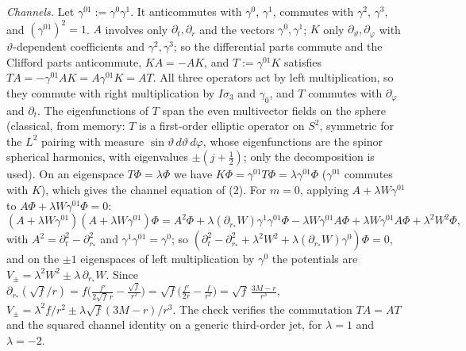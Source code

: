 \emph{Channels.} Let $\gamma^{01} := \gamma^{0}\gamma^{1}$. It anticommutes with $\gamma^{0}$, $\gamma^{1}$, commutes with $\gamma^{2}$, $\gamma^{3}$, and $(\gamma^{01})^{2} = 1$. $A$ involves only $\partial_{t}, \partial_{r}$ and the vectors $\gamma^{0}, \gamma^{1}$; $K$ only $\partial_{\vartheta}, \partial_{\varphi}$ with $\vartheta$-dependent coefficients and $\gamma^{2}, \gamma^{3}$; so the differential parts commute and the Clifford parts anticommute, $KA = -AK$, and $T := \gamma^{01}K$ satisfies $TA = -\gamma^{01}AK = A\gamma^{01}K = AT$. All three operators act by left multiplication, so they commute with right multiplication by $I\sigma_{3}$ and $\gamma_{0}$, and $T$ commutes with $\partial_{\varphi}$ and $\partial_{t}$. The eigenfunctions of $T$ span the even multivector fields on the sphere (classical, from memory: $T$ is a first-order elliptic operator on $S^{2}$, symmetric for the $L^{2}$ pairing with measure $\sin\vartheta\,d\vartheta\,d\varphi$, whose eigenfunctions are the spinor spherical harmonics, with eigenvalues $\pm(j + \tfrac12)$; only the decomposition is used). On an eigenspace $T\Phi = \lambda\Phi$ we have $K\Phi = \gamma^{01}T\Phi = \lambda\gamma^{01}\Phi$ ($\gamma^{01}$ commutes with $K$), which gives the channel equation of (2). For $m = 0$, applying $A + \lambda W\gamma^{01}$ to $A\Phi + \lambda W\gamma^{01}\Phi = 0$:
\[
(A + \lambda W\gamma^{01})(A + \lambda W\gamma^{01})\Phi = A^{2}\Phi + \lambda(\partial_{r_{*}}W)\gamma^{1}\gamma^{01}\Phi - \lambda W\gamma^{01}A\Phi + \lambda W\gamma^{01}A\Phi + \lambda^{2}W^{2}\Phi ,
\]
with $A^{2} = \partial_{t}^{2} - \partial_{r_{*}}^{2}$ and $\gamma^{1}\gamma^{01} = \gamma^{0}$; so $(\partial_{t}^{2} - \partial_{r_{*}}^{2} + \lambda^{2}W^{2} + \lambda(\partial_{r_{*}}W)\gamma^{0})\Phi = 0$, and on the $\pm1$ eigenspaces of left multiplication by $\gamma^{0}$ the potentials are $V_{\pm} = \lambda^{2}W^{2} \pm \lambda\,\partial_{r_{*}}W$. Since $\partial_{r_{*}}(\sqrt f/r) = f\bigl(\tfrac{f'}{2\sqrt f\,r} - \tfrac{\sqrt f}{r^{2}}\bigr) = \sqrt f\bigl(\tfrac{f'}{2r} - \tfrac{f}{r^{2}}\bigr) = \sqrt f\,\tfrac{3M - r}{r^{3}}$, $V_{\pm} = \lambda^{2}f/r^{2} \pm \lambda\sqrt f(3M - r)/r^{3}$. The check verifies the commutation $TA = AT$ and the squared channel identity on a generic third-order jet, for $\lambda = 1$ and $\lambda = -2$.

